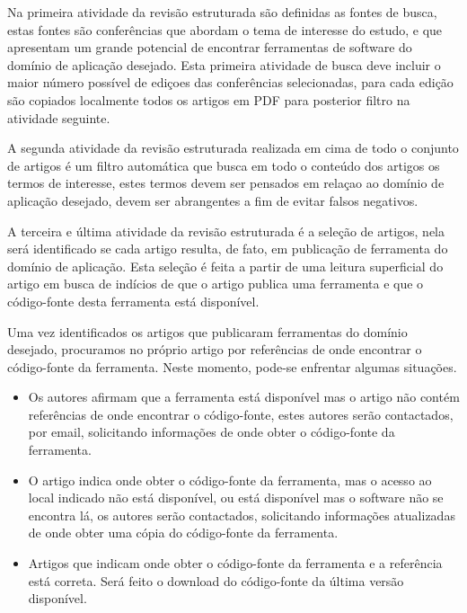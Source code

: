 Na primeira atividade da revisão estruturada são definidas as fontes de busca,
estas fontes são conferências que abordam o tema de interesse do estudo, e que
apresentam um grande potencial de encontrar ferramentas de software
do domínio de aplicação desejado. Esta primeira atividade de busca deve
incluir o maior número possível de ediçoes das conferências selecionadas, para
cada edição são copiados localmente todos os artigos em PDF para posterior
filtro na atividade seguinte.

A segunda atividade da revisão estruturada realizada em cima de todo o conjunto
de artigos é um filtro automática que busca em todo o conteúdo dos artigos os
termos de interesse, estes termos devem ser pensados em relaçao ao domínio de aplicação
desejado, devem ser abrangentes a fim de evitar falsos negativos.

A terceira e última atividade da revisão estruturada é a seleção de artigos,
nela será identificado se cada artigo resulta, de fato, em publicação de
ferramenta do domínio de aplicação. Esta seleção é feita a partir de uma
leitura superficial do artigo em busca de indícios de que o artigo publica uma
ferramenta e que o código-fonte desta ferramenta está disponível.

Uma vez identificados os artigos que publicaram ferramentas do domínio
desejado, procuramos no próprio artigo por referências de onde encontrar o
código-fonte da ferramenta. Neste momento, pode-se enfrentar algumas situações.

\begin{itemize}

  \item Os autores afirmam que a ferramenta está disponível mas o artigo
    não contém referências de onde encontrar o código-fonte, estes
    autores serão contactados, por email, solicitando informações de onde
    obter o código-fonte da ferramenta.

  \item O artigo indica onde obter o código-fonte da ferramenta, mas o acesso ao local
    indicado não está disponível, ou está disponível mas o software não se
    encontra lá, os autores serão contactados, solicitando informações
    atualizadas de onde obter uma cópia do código-fonte da ferramenta.

  \item Artigos que indicam onde obter o código-fonte da ferramenta e a referência
    está correta. Será feito o download do código-fonte da última versão
    disponível.

\end{itemize}

